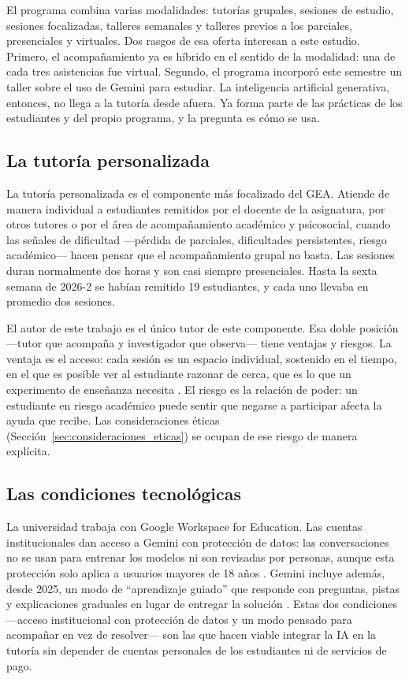 El programa combina varias modalidades: tutorías grupales, sesiones de estudio, sesiones focalizadas, talleres semanales y talleres previos a los parciales, presenciales y virtuales. Dos rasgos de esa oferta interesan a este estudio. Primero, el acompañamiento ya es híbrido en el sentido de la modalidad: una de cada tres asistencias fue virtual. Segundo, el programa incorporó este semestre un taller sobre el uso de Gemini para estudiar. La inteligencia artificial generativa, entonces, no llega a la tutoría desde afuera. Ya forma parte de las prácticas de los estudiantes y del propio programa, y la pregunta es cómo se usa.

\subsection*{La tutoría personalizada}

La tutoría personalizada es el componente más focalizado del GEA. Atiende de manera individual a estudiantes remitidos por el docente de la asignatura, por otros tutores o por el área de acompañamiento académico y psicosocial, cuando las señales de dificultad ---pérdida de parciales, dificultades persistentes, riesgo académico--- hacen pensar que el acompañamiento grupal no basta. Las sesiones duran normalmente dos horas y son casi siempre presenciales. Hasta la sexta semana de 2026-2 se habían remitido 19 estudiantes, y cada uno llevaba en promedio dos sesiones.

El autor de este trabajo es el único tutor de este componente. Esa doble posición ---tutor que acompaña y investigador que observa--- tiene ventajas y riesgos. La ventaja es el acceso: cada sesión es un espacio individual, sostenido en el tiempo, en el que es posible ver al estudiante razonar de cerca, que es lo que un experimento de enseñanza necesita \parencite{steffe2000teaching}. El riesgo es la relación de poder: un estudiante en riesgo académico puede sentir que negarse a participar afecta la ayuda que recibe. Las consideraciones éticas (Sección~\ref{sec:consideraciones_eticas}) se ocupan de ese riesgo de manera explícita.

\subsection*{Las condiciones tecnológicas}

La universidad trabaja con Google Workspace for Education. Las cuentas institucionales dan acceso a Gemini con protección de datos: las conversaciones no se usan para entrenar los modelos ni son revisadas por personas, aunque esta protección solo aplica a usuarios mayores de 18 años \parencite{google2025workspaceedu}. Gemini incluye además, desde 2025, un modo de ``aprendizaje guiado'' que responde con preguntas, pistas y explicaciones graduales en lugar de entregar la solución \parencite{google2025guided}. Estas dos condiciones ---acceso institucional con protección de datos y un modo pensado para acompañar en vez de resolver--- son las que hacen viable integrar la IA en la tutoría sin depender de cuentas personales de los estudiantes ni de servicios de pago.

